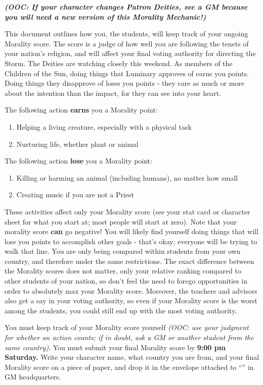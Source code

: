 \documentclass[green]{GL2020}
\begin{document}
\name{\gCoSStudentMorality{}}
\emph{\textbf{(OOC: If your character changes Patron Deities, see a GM because you will need a new version of this Morality Mechanic!)}}

This document outlines how you, the students, will keep track of your ongoing Morality score. The score is a judge of how well you are following the tenets of your nation’s religion, and will affect your final voting authority for directing the Storm. The Deities are watching closely this weekend. As members of the Children of the Sun, doing things that Luminary approves of earns you points. Doing things they disapprove of loses you points - they care as much or more about the intention than the impact, for they can see into your heart.

The following action \textbf{earns} you a Morality point:
\begin{enumerate}
  \item Helping a living creature, especially with a physical task
  \item Nurturing life, whether plant or animal
\end{enumerate}

The following action \textbf{lose} you a Morality point:
\begin{enumerate}
  \item Killing or harming an animal (including humans), no matter how small
  \item Creating music if you are not a Priest
\end{enumerate}

These activities affect only your Morality score (see your stat card or character sheet for what you start at; most people will start at zero).  Note that your morality score \textbf{can} go negative! You will likely find yourself doing things that will lose you points to accomplish other goals - that’s okay; everyone will be trying to walk that line. You are only being compared within students from your own country, and therefore under the same restrictions. The exact difference between the Morality scores does not matter, only your relative ranking compared to other students of your nation, so don’t feel the need to forego opportunities in order to absolutely max your Morality score. Moreover, the teachers and advisors also get a say in your voting authority, so even if your Morality score is the worst among the students, you could still end up with the most voting authority. 

You must keep track of your Morality score yourself \emph{(OOC: use your judgment for whether an action counts; if in doubt, ask a GM or another student from the same country)}. You must submit your final Morality score by \textbf{9:00 pm Saturday.} Write your character name, what country you are from, and your final Morality score on a piece of paper, and drop it in the envelope attached to “\sSignV{}” in GM headquarters. 
\end{document}
